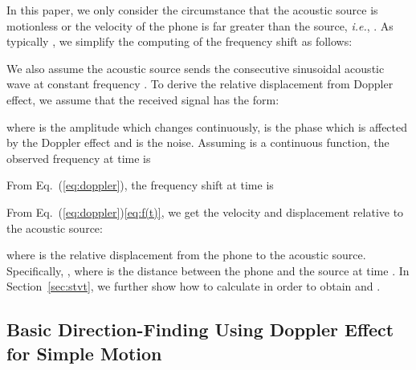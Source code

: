 \documentclass[]{sig-alternate-10pt}
\def\ie{\textit{i.e.}\xspace}
\newcommand{\eqqref}[1]{Eq.~(\ref{#1})}
\begin{document}
In this paper, we only consider the circumstance that the acoustic
source is motionless or the velocity of the phone is far greater than
the source, \ie, .
As typically ,
we simplify the computing of the frequency shift  as follows:

We also assume the acoustic source sends the consecutive sinusoidal
acoustic wave at constant frequency .
To  derive the relative displacement from Doppler effect, we  assume
that the received signal has the form:

where  is the amplitude which changes continuously,
 is the phase which is affected by the Doppler effect and
 is the noise. Assuming  is a continuous function,
the observed frequency  at  time  is

From \eqqref{eq:doppler}, the frequency shift  at  time  is


From \eqqref{eq:doppler}\eqref{eq:f(t)},
we get the velocity and displacement relative to the acoustic source:

where  is the relative displacement from the phone to the acoustic source. Specifically, , where  is the distance between the phone and the source at
time .
In Section~\ref{sec:stvt}, we further show how to calculate 
in order to obtain  and .

\subsection{Basic Direction-Finding Using Doppler Effect for Simple Motion}
\end{document}
